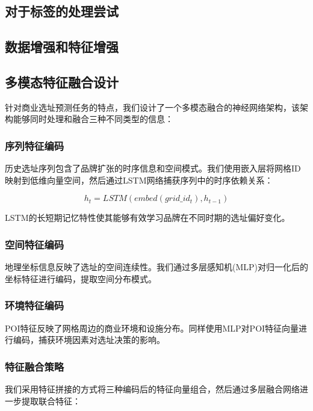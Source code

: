 \documentclass{article}
\begin{document}
\subsection{对于标签的处理尝试}


\subsection{数据增强和特征增强}


\subsection{多模态特征融合设计}

针对商业选址预测任务的特点，我们设计了一个多模态融合的神经网络架构，该架构能够同时处理和融合三种不同类型的信息：

\subsubsection{序列特征编码}
历史选址序列包含了品牌扩张的时序信息和空间模式。我们使用嵌入层将网格ID映射到低维向量空间，然后通过LSTM网络捕获序列中的时序依赖关系：

\begin{equation}
h_t = LSTM(embed(grid\_id_t), h_{t-1})
\end{equation}

LSTM的长短期记忆特性使其能够有效学习品牌在不同时期的选址偏好变化。

\subsubsection{空间特征编码}
地理坐标信息反映了选址的空间连续性。我们通过多层感知机(MLP)对归一化后的坐标特征进行编码，提取空间分布模式。

\subsubsection{环境特征编码}
POI特征反映了网格周边的商业环境和设施分布。同样使用MLP对POI特征向量进行编码，捕获环境因素对选址决策的影响。

\subsubsection{特征融合策略}
我们采用特征拼接的方式将三种编码后的特征向量组合，然后通过多层融合网络进一步提取联合特征：
\end{document}
